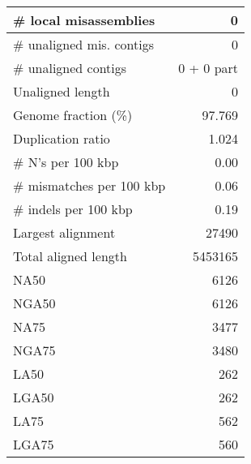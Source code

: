 \documentclass[12pt,a4paper]{article}
\begin{document}
\begin{table}[ht]
\begin{center}
\begin{tabular}{|l*{1}{|r}|}
\# local misassemblies & 0 \\ \hline
\# unaligned mis. contigs & 0 \\ \hline
\# unaligned contigs & 0 + 0 part \\ \hline
Unaligned length & 0 \\ \hline
Genome fraction (\%) & 97.769 \\ \hline
Duplication ratio & 1.024 \\ \hline
\# N's per 100 kbp & 0.00 \\ \hline
\# mismatches per 100 kbp & 0.06 \\ \hline
\# indels per 100 kbp & 0.19 \\ \hline
Largest alignment & 27490 \\ \hline
Total aligned length & 5453165 \\ \hline
NA50 & 6126 \\ \hline
NGA50 & 6126 \\ \hline
NA75 & 3477 \\ \hline
NGA75 & 3480 \\ \hline
LA50 & 262 \\ \hline
LGA50 & 262 \\ \hline
LA75 & 562 \\ \hline
LGA75 & 560 \\ \hline
\end{tabular}
\end{center}
\end{table}
\end{document}
